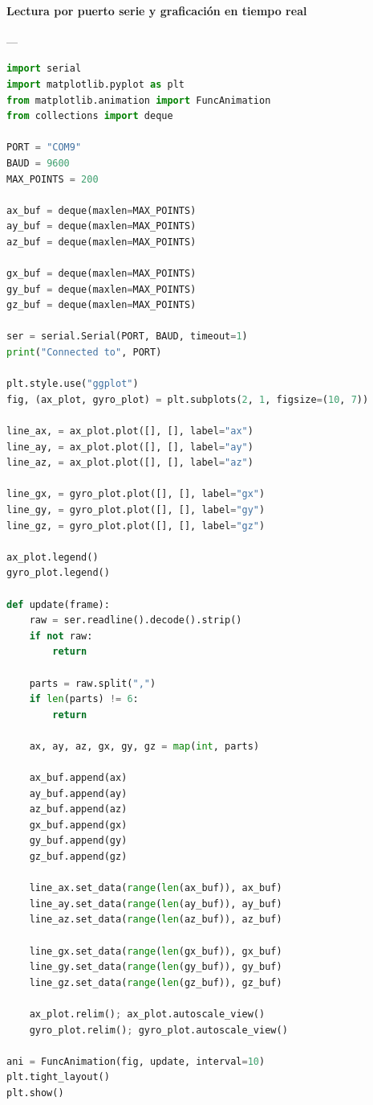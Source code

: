 \paragraph{Lectura por puerto serie y graficación en tiempo real}\label{anexo:PythonMPU}---
\begin{lstlisting}[language=Python, caption={Script Python para calibrar acelerómetro y giroscopio}]
import serial
import matplotlib.pyplot as plt
from matplotlib.animation import FuncAnimation
from collections import deque

PORT = "COM9"
BAUD = 9600
MAX_POINTS = 200

ax_buf = deque(maxlen=MAX_POINTS)
ay_buf = deque(maxlen=MAX_POINTS)
az_buf = deque(maxlen=MAX_POINTS)

gx_buf = deque(maxlen=MAX_POINTS)
gy_buf = deque(maxlen=MAX_POINTS)
gz_buf = deque(maxlen=MAX_POINTS)

ser = serial.Serial(PORT, BAUD, timeout=1)
print("Connected to", PORT)

plt.style.use("ggplot")
fig, (ax_plot, gyro_plot) = plt.subplots(2, 1, figsize=(10, 7))

line_ax, = ax_plot.plot([], [], label="ax")
line_ay, = ax_plot.plot([], [], label="ay")
line_az, = ax_plot.plot([], [], label="az")

line_gx, = gyro_plot.plot([], [], label="gx")
line_gy, = gyro_plot.plot([], [], label="gy")
line_gz, = gyro_plot.plot([], [], label="gz")

ax_plot.legend()
gyro_plot.legend()

def update(frame):
    raw = ser.readline().decode().strip()
    if not raw:
        return

    parts = raw.split(",")
    if len(parts) != 6:
        return

    ax, ay, az, gx, gy, gz = map(int, parts)

    ax_buf.append(ax)
    ay_buf.append(ay)
    az_buf.append(az)
    gx_buf.append(gx)
    gy_buf.append(gy)
    gz_buf.append(gz)

    line_ax.set_data(range(len(ax_buf)), ax_buf)
    line_ay.set_data(range(len(ay_buf)), ay_buf)
    line_az.set_data(range(len(az_buf)), az_buf)

    line_gx.set_data(range(len(gx_buf)), gx_buf)
    line_gy.set_data(range(len(gy_buf)), gy_buf)
    line_gz.set_data(range(len(gz_buf)), gz_buf)

    ax_plot.relim(); ax_plot.autoscale_view()
    gyro_plot.relim(); gyro_plot.autoscale_view()

ani = FuncAnimation(fig, update, interval=10)
plt.tight_layout()
plt.show()
\end{lstlisting}


